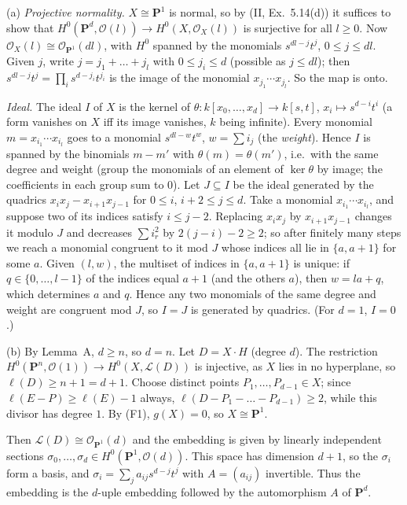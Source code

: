 \documentclass[11pt]{article}
\begin{document}
(a) \emph{Projective normality.} $X\cong\mathbf P^1$ is normal, so by (II, Ex.~5.14(d)) it suffices to show that $H^0(\mathbf P^d,\mathcal O(l))\to H^0(X,\mathcal O_X(l))$ is surjective for all $l\ge0$. Now $\mathcal O_X(l)\cong\mathcal O_{\mathbf P^1}(dl)$, with $H^0$ spanned by the monomials $s^{dl-j}t^j$, $0\le j\le dl$. Given $j$, write $j=j_1+\dots+j_l$ with $0\le j_i\le d$ (possible as $j\le dl$); then $s^{dl-j}t^j=\prod_i s^{d-j_i}t^{j_i}$ is the image of the monomial $x_{j_1}\cdots x_{j_l}$. So the map is onto.

\emph{Ideal.} The ideal $I$ of $X$ is the kernel of $\theta:k[x_0,\dots,x_d]\to k[s,t]$, $x_i\mapsto s^{d-i}t^i$ (a form vanishes on $X$ iff its image vanishes, $k$ being infinite). Every monomial $m=x_{i_1}\cdots x_{i_l}$ goes to a monomial $s^{dl-w}t^w$, $w=\sum i_j$ (the \emph{weight}). Hence $I$ is spanned by the binomials $m-m'$ with $\theta(m)=\theta(m')$, i.e.\ with the same degree and weight (group the monomials of an element of $\ker\theta$ by image; the coefficients in each group sum to $0$). Let $J\subseteq I$ be the ideal generated by the quadrics $x_ix_j-x_{i+1}x_{j-1}$ for $0\le i$, $i+2\le j\le d$. Take a monomial $x_{i_1}\cdots x_{i_l}$, and suppose two of its indices satisfy $i\le j-2$. Replacing $x_ix_j$ by $x_{i+1}x_{j-1}$ changes it modulo $J$ and decreases $\sum i_r^2$ by $2(j-i)-2\ge2$; so after finitely many steps we reach a monomial congruent to it mod $J$ whose indices all lie in $\{a,a+1\}$ for some $a$. Given $(l,w)$, the multiset of indices in $\{a,a+1\}$ is unique: if $q\in\{0,\dots,l-1\}$ of the indices equal $a+1$ (and the others $a$), then $w=la+q$, which determines $a$ and $q$. Hence any two monomials of the same degree and weight are congruent mod $J$, so $I=J$ is generated by quadrics. (For $d=1$, $I=0$.)

(b) By Lemma~A, $d\ge n$, so $d=n$. Let $D=X\cdot H$ (degree $d$). The restriction $H^0(\mathbf P^n,\mathcal O(1))\to H^0(X,\mathcal L(D))$ is injective, as $X$ lies in no hyperplane, so $\ell(D)\ge n+1=d+1$. Choose distinct points $P_1,\dots,P_{d-1}\in X$; since $\ell(E-P)\ge\ell(E)-1$ always, $\ell(D-P_1-\dots-P_{d-1})\ge2$, while this divisor has degree $1$. By (F1), $g(X)=0$, so $X\cong\mathbf P^1$.

Then $\mathcal L(D)\cong\mathcal O_{\mathbf P^1}(d)$ and the embedding is given by linearly independent sections $\sigma_0,\dots,\sigma_d\in H^0(\mathbf P^1,\mathcal O(d))$. This space has dimension $d+1$, so the $\sigma_i$ form a basis, and $\sigma_i=\sum_ja_{ij}s^{d-j}t^j$ with $A=(a_{ij})$ invertible. Thus the embedding is the $d$-uple embedding followed by the automorphism $A$ of $\mathbf P^d$.
\end{document}
